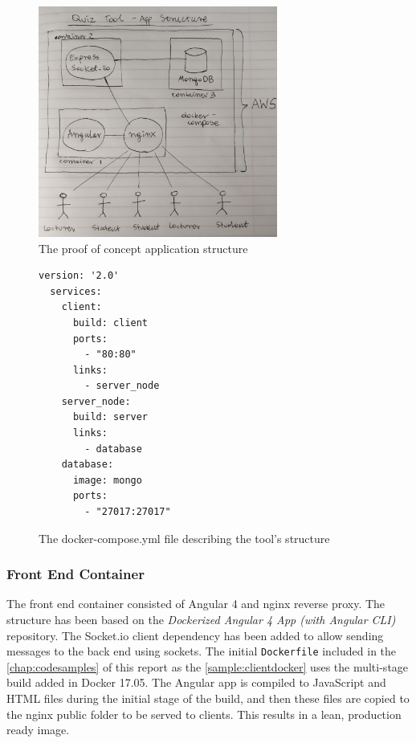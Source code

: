 \begin{figure}[ht]
    \centering
    \includegraphics[width=0.7\textwidth]{../../design/app_structure.jpg}
    \caption{The proof of concept application structure}
    \label{fig:appstrucure}
\end{figure}

\begin{figure}[h!]
  \begin{lstlisting}[basicstyle=\small]
  version: '2.0'
  services:
    client:
      build: client
      ports:
        - "80:80"
      links:
        - server_node
    server_node:
      build: server
      links:
        - database
    database:
      image: mongo
      ports:
        - "27017:27017"
  \end{lstlisting}
  \caption{The docker-compose.yml file describing the tool's structure}
\end{figure}

\newpage
\subsubsection{Front End Container}
The front end container consisted of Angular 4 and nginx reverse proxy. The structure
has been based on the \textit{Dockerized Angular 4 App (with Angular CLI)} repository\cite{35}.
The Socket.io client dependency has been added to allow sending messages to the back end
using sockets. The initial \texttt{Dockerfile} included in the \autoref{chap:codesamples} of this report
as the \autoref{sample:clientdocker} uses the multi-stage build added in Docker 17.05. The
Angular app is compiled to JavaScript and HTML files during the initial stage of the build,
and then these files are copied to the nginx public folder to be served to clients.
This results in a lean, production ready image.

